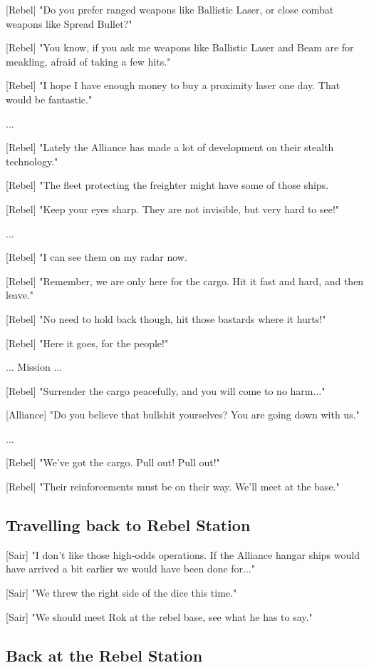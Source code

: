 \documentclass[a4paper,12pt]{article}
\begin{document}
[Rebel] "Do you prefer ranged weapons like Ballistic Laser, or close combat
weapons like Spread Bullet?" 

[Rebel] "You know, if you ask me weapons like Ballistic Laser and Beam
are for meakling, afraid of taking a few hits."

[Rebel] "I hope I have enough money to buy a proximity laser one day. That would be fantastic."

...

[Rebel] "Lately the Alliance has made a lot of development on their stealth technology."

[Rebel] "The fleet protecting the freighter might have some of those ships. 

[Rebel] "Keep your eyes sharp. They are not invisible, but very hard to see!"

...

[Rebel] "I can see them on my radar now. 

[Rebel] "Remember, we are only here for the cargo. Hit it fast and hard, and then leave."

[Rebel] "No need to hold back though, hit those bastards where it hurts!"

[Rebel] "Here it goes, for the people!"

... Mission ...

[Rebel] "Surrender the cargo peacefully, and you will come to no harm..."

[Alliance] "Do you believe that bullshit yourselves? You are going down with us."

...

[Rebel] "We've got the cargo. Pull out! Pull out!" 

[Rebel] "Their reinforcements must be on their way. We'll meet at the base."

\subsection{Travelling back to Rebel Station}

[Sair] "I don't like those high-odds operations. If the Alliance hangar ships would have
arrived a bit earlier we would have been done for..."

[Sair] "We threw the right side of the dice this time." 

[Sair] "We should meet Rok at the rebel base, see what he has to say."

\subsection{Back at the Rebel Station}
\end{document}
